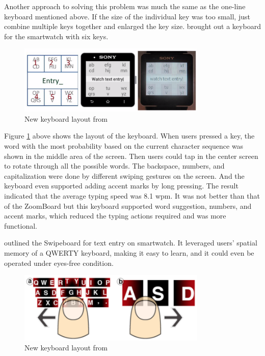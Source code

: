 \documentclass[11pt]{article}
\begin{document}
Another approach to solving this problem was much the same as the one-line keyboard \citep{10.1145/2047196.2047257} mentioned above. If the size of the individual key was too small, just combine multiple keys together and enlarged the key size. \citet{6926662} brought out a keyboard for the smartwatch with six keys.

\begin{figure}[H]
  \centering
  \includegraphics[width=0.8\textwidth]{Watch2014T9.png}
  \caption{New keyboard layout from \citep{6926662}}
  \label{fig:watch2014t9}
\end{figure}

Figure \ref{fig:watch2014t9} above shows the layout of the keyboard. When users pressed a key, the word with the most probability based on the current character sequence was shown in the middle area of the screen. Then users could tap in the center screen to rotate through all the possible words. The backspace, numbers, and capitalization were done by different swiping gestures on the screen. And the keyboard even supported adding accent marks by long pressing. The result indicated that the average typing speed was 8.1 wpm. It was not better than that of the ZoomBoard but this keyboard supported word suggestion, numbers, and accent marks, which reduced the typing actions required and was more functional.

\citet{10.1145/2642918.2647354} outlined the Swipeboard for text entry on smartwatch. It leveraged users' spatial memory of a QWERTY keyboard, making it easy to learn, and it could even be operated under eyes-free condition.

\begin{figure}[H]
  \centering
  \includegraphics[width=0.8\textwidth]{SwipeBoard.png}
  \caption{New keyboard layout from \citep{10.1145/2642918.2647354}}
  \label{fig:swipeboard}
\end{figure}
\end{document}
